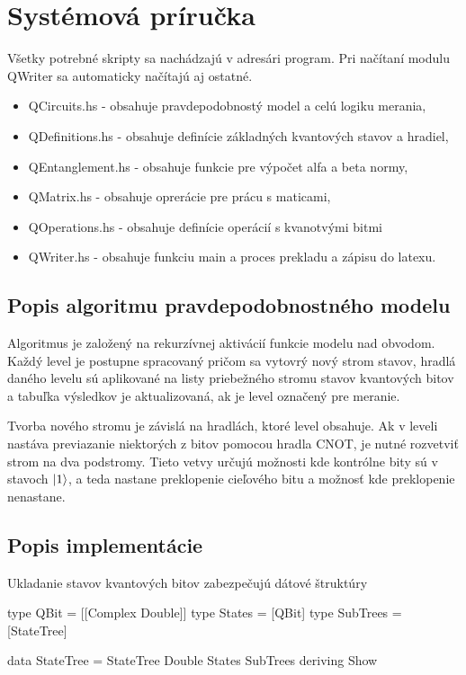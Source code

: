 
\chapter{Systémová príručka}

Všetky potrebné skripty sa nachádzajú v adresári program. Pri načítaní modulu
QWriter sa automaticky načítajú aj ostatné. 
\begin{itemize}
    \item QCircuits.hs - obsahuje pravdepodobnostý model a celú logiku merania,
    \item QDefinitions.hs - obsahuje definície základných kvantových stavov a
hradiel,
    \item QEntanglement.hs - obsahuje funkcie pre výpočet alfa a beta normy,
    \item QMatrix.hs - obsahuje oprerácie pre prácu s maticami,
    \item QOperations.hs - obsahuje definície operácií s kvanotvými bitmi
    \item QWriter.hs - obsahuje funkciu main a proces prekladu a zápisu do
latexu.
\end{itemize}

\section{Popis algoritmu pravdepodobnostného modelu}

Algoritmus je založený na rekurzívnej aktivácií funkcie modelu nad obvodom.
Každý level je postupne spracovaný pričom sa vytovrý nový strom stavov, hradlá
daného levelu sú aplikované na listy priebežného stromu stavov kvantových bitov
a tabuľka výsledkov je aktualizovaná, ak je level označený pre meranie.

Tvorba nového stromu je závislá na hradlách, ktoré level obsahuje. Ak v leveli
nastáva previazanie niektorých z bitov pomocou hradla CNOT, je nutné rozvetviť
strom na dva podstromy. Tieto vetvy určujú možnosti kde kontrólne bity sú
v stavoch \(\ket{1}\), a teda nastane preklopenie cieľového bitu a možnosť
kde preklopenie nenastane.

\section{Popis implementácie}

Ukladanie stavov kvantových bitov zabezpečujú dátové štruktúry
\begin{code}
type QBit = [[Complex Double]]
type States = [QBit]
type SubTrees = [StateTree]

data StateTree = StateTree Double States SubTrees deriving Show
\end{code}

